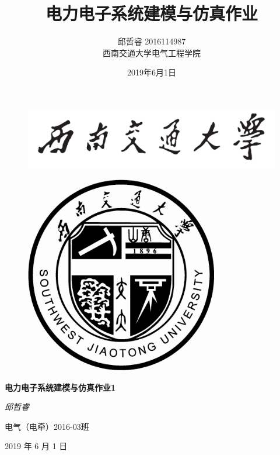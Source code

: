 \documentclass[UTF8]{ctexart}
\title{电力电子系统建模与仿真作业}
\author{邱哲睿 2016114987\\西南交通大学电气工程学院}
\date{2019年6月1日}
\numberwithin{equation}{section}
\begin{document}
	\begin{titlepage}
		\begin{center}
			\begin{figure}[htbp]
				\centering
				\includegraphics[scale=0.25]{image/School_Name.png}
			\end{figure}
			\begin{figure}[htbp]
				\centering
				\includegraphics[scale=2.7]{image/School_Badge.png}
			\end{figure}
			\phantom{h}
			\newline
			\phantom{h}
			\newline
			\phantom{h}
			\newline
			
			\normalfont \centering
			{\Huge \bfseries 电力电子系统建模与仿真作业1}
			
			\phantom{h}
			\newline
			
			\bigskip
			{\Huge \itshape 邱哲睿}
			
			\bigskip
			\bigskip
			{\Huge {}}
			
			\bigskip
			\bigskip
			{\LARGE 电气（电牵）2016-03班}
			
			\bigskip
			\bigskip
			{\LARGE 2019 年 6 月 1 日}
		\end{center}
	\end{titlepage}
	\maketitle
	\pagestyle{plain}
\end{document}
